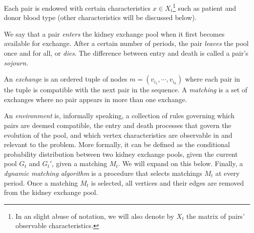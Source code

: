 Each pair is endowed with certain characteristics $x \in X_t$\footnote{In an slight abuse of notation, we will also denote by $X_t$ the matrix of pairs' observable characteristics.} such as patient and donor blood type (other characteristics will be discussed below). 

We say that a pair \emph{enters} the kidney exchange pool when it first becomes available for exchange. After a certain number of periods, the pair \emph{leaves} the pool once and for all, or \emph{dies}. The difference between entry and death is called a pair's \emph{sojourn}.

An \emph{exchange} is an ordered tuple of nodes $m = (v_{i_1}, \cdots, v_{i_{k}})$ where each pair in the tuple is compatible with the next pair in the sequence. A \emph{matching} is a set of exchanges where no pair appears in more than one exchange. 

An \emph{environment} is, informally speaking, a collection of rules governing which pairs are deemed compatible, the entry and death processes that govern the evolution of the pool, and which vertex characteristics are observable in and relevant to the problem. More formally, it can be defined as the conditional probability distribution between two kidney exchange pools, given the current pool $G_t$ and $G_t'$, given a matching $M_t$. We will expand on this below. Finally, a \emph{dynamic matching algorithm} is a procedure that selects matchings $M_t$ at every period. Once a matching $M_t$ is selected, all vertices and their edges are removed from the kidney exchange pool.



% 


